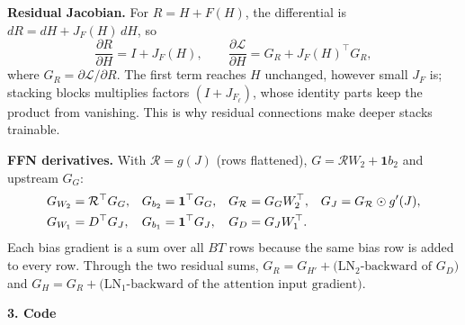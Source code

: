 \documentclass[11pt,a4paper]{article}
\numberwithin{equation}{section}
\newcommand{\T}{^{\top}}
\newcommand{\one}{\mathbf 1}
\DeclareRobustCommand{\code}[1]{\texttt{\detokenize{#1}}}
\newcommand{\stephead}[1]{\par\smallskip\noindent\textbf{\small #1}\par\nobreak}
\begin{document}
\textbf{Residual Jacobian.} For $R=H+F(H)$, the differential is $dR=dH+J_F(H)\,dH$, so
\begin{equation}
\frac{\partial R}{\partial H}=I+J_F(H),\qquad
\frac{\partial\mathcal L}{\partial H}=G_R+J_F(H)\T G_R ,
\end{equation}
where $G_R=\partial\mathcal L/\partial R$. The first term reaches $H$ unchanged, however small $J_F$ is; stacking blocks
multiplies factors $(I+J_{F_\ell})$, whose identity parts keep the product from vanishing. This is why residual connections
make deeper stacks trainable.

\textbf{FFN derivatives.} With $\mathcal R=g(J)$ (rows flattened), $G=\mathcal RW_2+\one b_2$ and upstream $G_G$:
\begin{align}
G_{W_2}&=\mathcal R\T G_G, & G_{b_2}&=\one\T G_G, & G_{\mathcal R}&=G_GW_2\T, & G_J&=G_{\mathcal R}\odot g'(J),\\
G_{W_1}&=D\T G_J, & G_{b_1}&=\one\T G_J, & G_D&=G_JW_1\T . \notag
\end{align}
Each bias gradient is a sum over all $BT$ rows because the same bias row is added to every row. Through the two residual
sums, $G_R=G_{H'}+\big(\text{LN}_2\text{-backward of }G_D\big)$ and $G_H=G_R+\big(\text{LN}_1\text{-backward of the attention input gradient}\big)$.

\stephead{3. Code}








\end{document}
